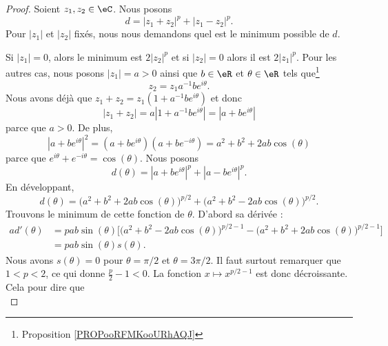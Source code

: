 	\begin{proof}
		Soient \( z_1,z_2\in \eC\). Nous posons
		\begin{equation}        \label{EQooJKYZooFzbETG}
			d=| z_1+z_2 |^p+| z_1-z_2 |^p.
		\end{equation}
		Pour \( | z_1 |\) et \( | z_2 |\) fixés, nous nous demandons quel est le minimum possible de \( d\).

		Si \( | z_1 |=0\), alors le minimum est \( 2| z_2 |^p\) et si \( | z_2 |=0\) alors il est \( 2| z_1 |^p\). Pour les autres cas, nous posons \( | z_1 |=a>0\) ainsi que \( b\in \eR\) et \( \theta\in \eR\) tels que\footnote{Proposition \ref{PROPooRFMKooURhAQJ}}
		\begin{equation}
			z_2=z_1a^{-1}b e^{i\theta}.
		\end{equation}
		Nous avons déjà que \( z_1+z_2=z_1(1+a^{-1}b e^{i\theta})\) et donc
		\begin{equation}
			| z_1+z_2 |=a| 1+a^{-1}b e^{i\theta} |=| a+b e^{i\theta} |
		\end{equation}
		parce que \( a>0\). De plus,
		\begin{equation}
			| a+b e^{i\theta} |^2= (a+b e^{i\theta})(a+b e^{-i\theta})=a^2+b^2+2ab\cos(\theta)
		\end{equation}
		parce que \(  e^{i\theta}+ e^{-i\theta}=\cos(\theta)\). Nous posons
		\begin{equation}
			d(\theta)=| a+b e^{i\theta} |^p+| a-b e^{i\theta} |^p.
		\end{equation}
		En développant,
		\begin{equation}
			d(\theta)=\big(a^2+b^2+2ab\cos(\theta)\big)^{p/2}+\big(a^2+b^2-2ab\cos(\theta)\big)^{p/2}.
		\end{equation}
		Trouvons le minimum de cette fonction de \( \theta\). D'abord sa dérivée :
		\begin{subequations}
			\begin{align}
				ad'(\theta) & =pab\sin(\theta)\big[ \big( a^2+b^2-2ab\cos(\theta) \big)^{p/2-1}-\big( a^2+b^2+2ab\cos(\theta) \big)^{p/2-1}  \big] \\
				            & =pab\sin(\theta)s(\theta).
			\end{align}
		\end{subequations}
		Nous avons \( s(\theta)=0\) pour \( \theta=\pi/2\) et \( \theta=3\pi/2\). Il faut surtout remarquer que \( 1<p<2\), ce qui donne \( \frac{ p }{2}-1<0\). La fonction \( x\mapsto x^{p/2-1}\) est donc décroissante. Cela pour dire que
		\begin{equation}

\end{equation}
\end{proof}
